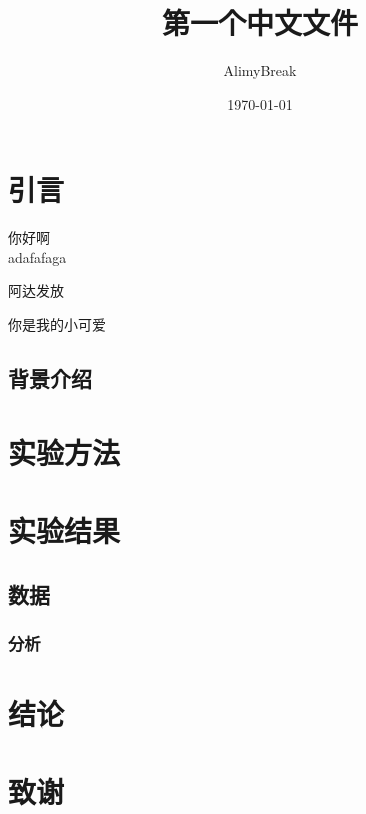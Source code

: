 \documentclass[12pt]{article}  %
\title{第一个中文文件}
\author{\kaishu AlimyBreak}
\date{\today}
\begin{document}
\maketitle
\tableofcontents

\section{引言}
你好啊\\adafafaga

阿达发放
\par{你是我的小可爱}

\subsection{背景介绍}
\section{实验方法}
\section{实验结果}
\subsection{数据}
\subsubsection{分析}
\section{结论}
\section{致谢}
\end{document}
